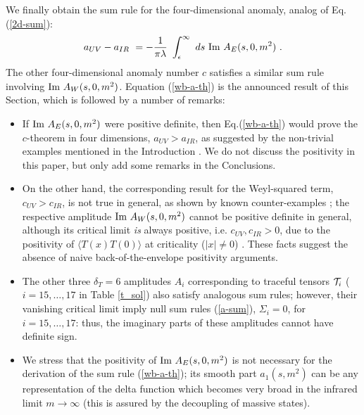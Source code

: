 \documentclass[11pt]{article}
\newcommand{\beq}{\begin{equation}}
\newcommand{\eeq}{\end{equation}}
\def\eps{\epsilon}
\def\l{\lambda}
\def\Im{\hbox{\rm Im\ }}
\def\bra{\langle}
\def\ket{\rangle}
\def\dt{{\delta_T}} %
\begin{document}
We finally obtain the sum rule for the four-dimensional 
anomaly, analog of Eq. (\ref{2d-sum}):
\beq
a_{UV} - a_{IR}\ = - \frac{1}{\pi\l}\ 
\int_\eps^\infty\ ds\ \Im A_E(s,0,m^2) \ .
\label{wb-a-th}
\eeq
The other four-dimensional anomaly number $c$ satisfies a 
similar sum rule involving $\Im A_W(s,0,m^2)$.
Equation (\ref{wb-a-th}) is the announced result of this Section,
which is followed by a number of remarks: 
\begin{itemize}
\item
If $\Im A_E(s,0,m^2)$ were positive definite,
then Eq.(\ref{wb-a-th}) would prove the $c$-theorem in four dimensions,
$a_{UV} > a_{IR}$,
as suggested by the non-trivial examples mentioned in the Introduction
\cite{afgj}\cite{fgpw}.
We do not discuss the positivity in this paper, but only add 
some remarks in the Conclusions. 
\item
On the other hand, the corresponding result for the Weyl-squared term, 
$c_{UV} > c_{IR}$, is not true in general, as shown by known
counter-examples \cite{cfl}\cite{afgj};
the respective amplitude $\Im A_W(s,0,m^2)$ cannot be positive definite 
in general, although its critical limit {\it is} always positive, 
i.e. $c_{UV},c_{IR}>0$, due to the positivity of $\bra T(x)T(0)\ket$
at criticality ($|x|\neq 0$) \cite{cfl}.
These facts suggest the absence of naive back-of-the-envelope 
positivity arguments.
\item
The other three $\dt=6$ amplitudes $A_i$
corresponding to traceful tensors ${\cal T}_i$
($i=15,\dots,17$ in Table \ref{t_sol})
also satisfy analogous sum rules; however, their vanishing critical
limit imply null sum rules (\ref{a-sum}), $\Sigma_i=0$, for $i=15,\dots,17$: 
thus, the imaginary parts of these amplitudes cannot have definite sign.
\item
We stress that the positivity of $\Im A_E(s,0,m^2)$ is not
necessary for the derivation of the sum rule (\ref{wb-a-th});
its smooth part $a_1(s,m^2)$
can be any representation of the delta function which becomes
very broad in the infrared limit $m\to\infty$ (this
is assured by the decoupling of massive states).
\end{itemize}
\end{document}
